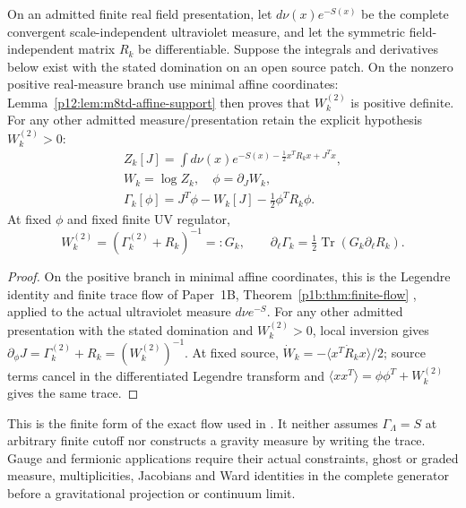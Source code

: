 \documentclass[12pt,a4paper]{article}
\begin{document}
\begin{theorem}
\label{p12:thm:v199-rgas-eaa}
On an admitted finite real field presentation, let \(d\nu(x)e^{-S(x)}\)
be the complete convergent scale-independent ultraviolet measure, and
let the symmetric field-independent matrix \(R_k\) be differentiable.
Suppose the integrals and derivatives below exist with the stated
domination on an open source patch. On the nonzero positive real-measure
branch use minimal affine coordinates: Lemma~\ref{p12:lem:m8td-affine-support}
then proves that \(W_k^{(2)}\) is positive definite. For any other admitted
measure/presentation retain the explicit hypothesis \(W_k^{(2)}>0\):
\[
 \begin{gathered}
 Z_k[J]=\int d\nu(x)e^{-S(x)-\frac12x^TR_kx+J^Tx},\\
 W_k=\log Z_k,\quad \phi=\partial_JW_k,\\
 \Gamma_k[\phi]=J^T\phi-W_k[J]-\tfrac12\phi^TR_k\phi .
 \end{gathered}
\]
At fixed \(\phi\) and fixed finite UV regulator,
\begin{equation}
\label{p12:eq:v199-rgas-eaa}
 W_k^{(2)}=(\Gamma_k^{(2)}+R_k)^{-1}=:G_k,\qquad
 \partial_\ell\Gamma_k
  =\tfrac12\operatorname{Tr}(G_k\partial_\ell R_k).
\end{equation}
\end{theorem}
\begin{proof}
On the positive branch in minimal affine coordinates, this is the
Legendre identity and finite trace flow of Paper~1B,
Theorem~\ref{p1b:thm:finite-flow} \cite{Kugelmann2026Paper1B}, applied
to the actual ultraviolet measure $d\nu e^{-S}$.
For any other admitted presentation with the stated domination and
$W_k^{(2)}>0$, local inversion gives
$\partial_\phi J=\Gamma_k^{(2)}+R_k=(W_k^{(2)})^{-1}$.
At fixed source, $\dot W_k=-\langle x^T\dot R_kx\rangle/2$;
source terms cancel in the differentiated Legendre transform and
$\langle xx^T\rangle=\phi\phi^T+W_k^{(2)}$ gives the same trace.
\end{proof}
This is the finite form of the exact flow used in
\cite{Wetterich1993,Reuter1998}.  It neither assumes
\(\Gamma_\Lambda=S\) at arbitrary finite cutoff nor constructs a gravity
measure by writing the trace.  Gauge and fermionic applications require
their actual constraints, ghost or graded measure, multiplicities,
Jacobians and Ward identities in the complete generator before a
gravitational projection or continuum limit.
\end{document}

